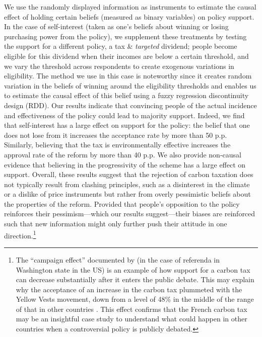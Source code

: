 \documentclass[12pt]{article} %
\begin{document}
We use the randomly displayed information as instruments to estimate the causal effect of holding certain beliefs (measured as binary variables) on policy support. In the case of self-interest (taken as one's beliefs about winning or losing purchasing power from the policy), we supplement these treatments by testing the support for a different policy, a tax \& \textit{targeted} dividend; people become eligible for this dividend when their incomes are below a certain threshold, and we vary the threshold across respondents to create exogenous variations in eligibility. The method we use in this case is noteworthy since it creates random variation in the beliefs of winning around the eligibility thresholds and enables us to estimate the causal effect of this belief using a fuzzy regression discontinuity design (RDD). Our results indicate that convincing people of the actual incidence and effectiveness of the policy could lead to majority support. Indeed, we find that self-interest has a large effect on support for the policy: the belief that one does not lose from it increases the acceptance rate by more than 50 p.p. Similarly, believing that the tax is environmentally effective increases the approval rate of the reform by more than 40 p.p. We also provide non-causal evidence that believing in the progressivity of the scheme has a large effect on support. Overall, these results suggest that the rejection of carbon taxation does not typically result from clashing principles, such as a disinterest in the climate or a dislike of price instruments but rather from overly pessimistic beliefs about the properties of the reform. Provided that people's opposition to the policy reinforces their pessimism---which our results suggest---their biases are reinforced such that new information might only further push their attitude in one direction.\footnote{The ``campaign effect'' documented by \citet{anderson_can_2019} (in the case of referenda in Washington state in the US) is an example of how support for a carbon tax can decrease substantially after it enters the public debate. This may explain why the acceptance of an increase in the carbon tax plummeted with the Yellow Vests movement, down from a level of 48\% \citep{ademe_representations_2018} in the middle of the range of that in other countries \citep{brechin_public_2010}. This effect confirms that the French carbon tax may be an insightful case study to understand what could happen in other countries when a controversial policy is publicly debated.} %
\end{document}
